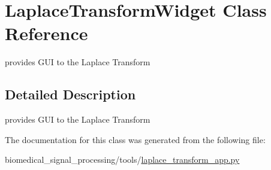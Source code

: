 \hypertarget{classLaplaceTransformWidget}{}\section{Laplace\+Transform\+Widget Class Reference}
\label{classLaplaceTransformWidget}


provides G\+UI to the Laplace Transform  




\subsection{Detailed Description}
provides G\+UI to the Laplace Transform 

The documentation for this class was generated from the following file\+:\begin{DoxyCompactItemize}
\item 
biomedical\+\_\+signal\+\_\+processing/tools/\hyperlink{laplace__transform__app_8py}{laplace\+\_\+transform\+\_\+app.\+py}\end{DoxyCompactItemize}
